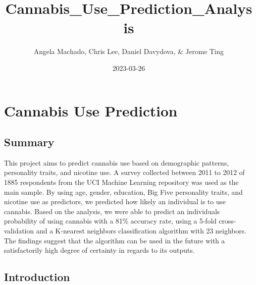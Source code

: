 \documentclass[
]{article}
\title{Cannabis\_Use\_Prediction\_Analysis}
\author{Angela Machado, Chris Lee, Daniel Davydova, \& Jerome Ting}
\date{2023-03-26}
\begin{document}
\maketitle

{
\setcounter{tocdepth}{2}
\tableofcontents
}
\hypertarget{cannabis-use-prediction}{%
\section{\texorpdfstring{\textbf{Cannabis Use Prediction}}{Cannabis Use Prediction}}\label{cannabis-use-prediction}}

\hypertarget{summary}{%
\subsection{\texorpdfstring{\textbf{Summary}}{Summary}}\label{summary}}

This project aims to predict cannabis use based on demographic patterns,
personality traits, and nicotine use. A survey collected between 2011 to
2012 of 1885 respondents from the UCI Machine Learning repository was
used as the main sample. By using age, gender, education, Big Five
personality traits, and nicotine use as predictors, we predicted how
likely an individual is to use cannabis. Based on the analysis, we were
able to predict an individual\textquotesingle s probability of using cannabis with a
81\% accuracy rate, using a 5-fold cross-validation and a K-nearest
neighbors classification algorithm with 23 neighbors. The findings
suggest that the algorithm can be used in the future with a
satisfactorily high degree of certainty in regards to its outputs.

\hypertarget{introduction}{%
\subsection{\texorpdfstring{\textbf{Introduction}}{Introduction}}\label{introduction}}
\end{document}
